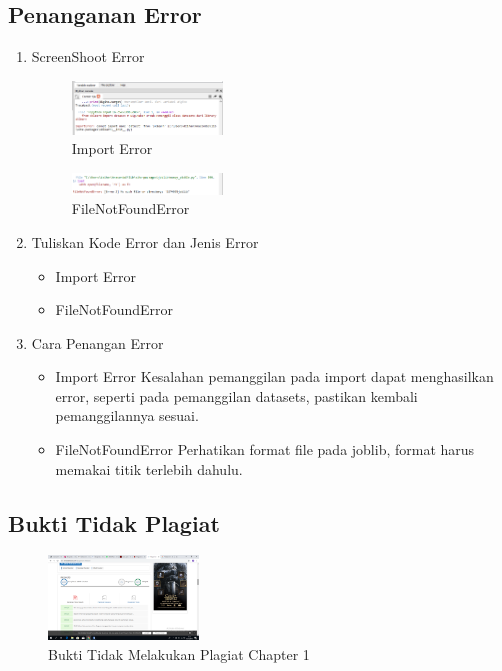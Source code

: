 \subsection{Penanganan Error}
\begin{enumerate}
	\item ScreenShoot Error
	\begin{figure}[H]
		\includegraphics[width=4cm]{figures/1174095/tugas1/error/1.PNG}
		\centering
		\caption{Import Error}
	\end{figure}
	\begin{figure}[H]
		\includegraphics[width=4cm]{figures/1174095/tugas1/error/2.PNG}
		\centering
		\caption{FileNotFoundError}
	\end{figure}
	\item Tuliskan Kode Error dan Jenis Error
	\begin{itemize}
		\item Import Error
		\item FileNotFoundError
	\end{itemize}
	\item Cara Penangan Error
	\begin{itemize}
		\item Import Error
		\hfill\break
		Kesalahan pemanggilan pada import dapat menghasilkan error, seperti pada pemanggilan datasets, pastikan kembali pemanggilannya sesuai.
		\item FileNotFoundError
		\hfill\break
		Perhatikan format file pada joblib, format harus memakai titik terlebih dahulu.
	\end{itemize}
\end{enumerate}
\subsection{Bukti Tidak Plagiat}
\begin{figure}[H]
	\includegraphics[width=4cm]{figures/1174095/tugas1/buktiplagiat/plag.PNG}
	\centering
	\caption{Bukti Tidak Melakukan Plagiat Chapter 1}
\end{figure}